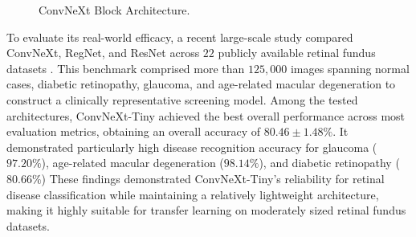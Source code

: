 \begin{figure}[htbp]
    \centering
    \caption{ConvNeXt Block Architecture.}
    \label{fig:convnext_block}
\end{figure}

To evaluate its real-world efficacy, a recent large-scale study compared ConvNeXt, RegNet, and ResNet across $22$ publicly available retinal fundus datasets \cite{Chopowiec2023}.
This benchmark comprised more than $125,000$ images spanning normal cases, diabetic retinopathy, glaucoma, and age-related macular degeneration to construct a clinically representative screening model.
Among the tested architectures, ConvNeXt-Tiny achieved the best overall performance across most evaluation metrics, obtaining an overall accuracy of $80.46 \pm 1.48\%$.
It demonstrated particularly high disease recognition accuracy for glaucoma ($97.20\%$), age-related macular degeneration ($98.14\%$), and diabetic retinopathy ($80.66\%$) These findings demonstrated ConvNeXt-Tiny's reliability for retinal disease classification while maintaining a relatively lightweight architecture, making it highly suitable for transfer learning on moderately sized retinal fundus datasets.

